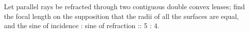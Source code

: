 Let parallel rays be refracted through two contiguous 
double convex lenses; find the focal length on the 
supposition that the radii of all the surfaces are
equal, and the sine of incidence : sine of 
refraction :: 5 : 4.
